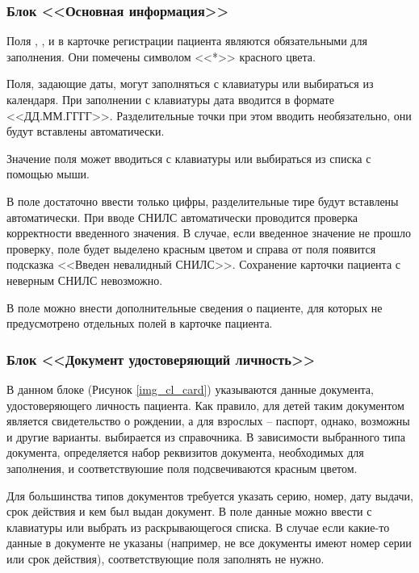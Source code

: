\subsubsection{Блок <<Основная информация>>}

Поля , ,  и  в карточке регистрации пациента являются обязательными для заполнения. Они помечены символом <<*>> красного цвета.

Поля, задающие даты, могут заполняться с клавиатуры или выбираться из календаря. При заполнении с клавиатуры дата вводится в формате <<ДД.ММ.ГГГГ>>. Разделительные точки при этом вводить необязательно, они будут вставлены автоматически.

Значение поля  может вводиться с клавиатуры или выбираться из списка с помощью мыши. 

В поле  достаточно ввести только цифры, разделительные тире будут вставлены автоматически. При вводе СНИЛС автоматически проводится проверка корректности введенного значения. В случае, если введенное значение не прошло проверку, поле будет выделено красным цветом и справа от поля появится подсказка <<Введен невалидный СНИЛС>>. Сохранение карточки пациента с неверным СНИЛС невозможно.

В поле  можно внести дополнительные сведения о пациенте, для которых не предусмотрено отдельных полей в карточке пациента. 
 
\subsubsection{Блок <<Документ удостоверяющий личность>>}

В данном блоке (Рисунок \ref{img_cl_card}) указываются данные документа, удостоверяющего личность пациента. Как правило, для детей таким документом является свидетельство о рождении, а для взрослых – паспорт, однако, возможны и другие варианты.  выбирается из справочника. В зависимости выбранного типа документа, определяется набор реквизитов документа, необходимых для заполнения, и соответствуюшие поля подсвечиваются красным цветом. 

Для большинства типов документов требуется указать серию, номер, дату выдачи, срок действия и кем был выдан документ. В поле  данные можно ввести с клавиатуры или выбрать из раскрывающегося списка. В случае если какие-то данные в документе не указаны (например, не все документы имеют номер серии или срок действия), соответствующие поля заполнять не нужно.

